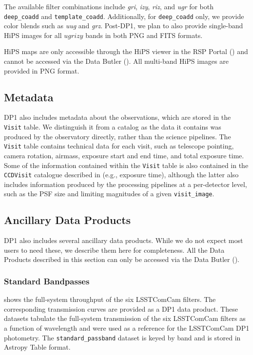 The available filter combinations include \textit{gri}, \textit{izy}, \textit{riz}, and \textit{ugr} for both \texttt{deep\_coadd} and \texttt{template\_coadd}.
Additionally, for \texttt{deep\_coadd} only, we provide color blends such as \textit{uug} and \textit{grz}.
Post-\gls{DP1}, we plan to also provide single-band HiPS images for all $ugrizy$ bands in both \gls{PNG} and \gls{FITS} formats.

\gls{HiPS} maps are only accessible through the \gls{HiPS} viewer in the \gls{RSP} Portal () and cannot be accessed via the Data \gls{Butler} ().
All multi-band \gls{HiPS} images are provided in \gls{PNG} format.

\subsection{Metadata}
\label{ssec:metadata}
\gls{DP1} also includes \gls{metadata} about the observations, which are stored in the \texttt{Visit} table.
We distinguish it from a catalog as the data it contains was produced by the observatory directly, rather than the science pipelines.
The \texttt{Visit} table contains technical data for each visit, such as telescope pointing, camera rotation, \gls{airmass}, exposure start and end time, and total exposure time.
Some of the information contained within the \texttt{Visit} table is also contained in the \texttt{CCDVisit} catalogue described in  (e.g., exposure time), although the latter also includes information produced by the processing pipelines at a per-detector level, such as the PSF size and limiting magnitudes of a given \texttt{visit\_image}.

\subsection{Ancillary Data Products}
\label{ssec:ancilliary}
\gls{DP1} also includes several ancillary data products.
While we do not expect most users to need these, we describe them here for completeness.
All the Data Products described in this section can only be accessed via the Data Butler ().

\subsubsection{Standard Bandpasses}
\label{sssec:transmission_curves}
 shows the full-system throughput of the six \gls{LSSTComCam} filters.
The corresponding transmission curves are provided as a \gls{DP1} data product.
These datasets tabulate the full-system transmission of the six \gls{LSSTComCam} filters as a function of wavelength and were used as a reference for the \gls{LSSTComCam} \gls{DP1} photometry. The \texttt{standard\_passband} dataset is keyed by band and is stored in Astropy Table format.

